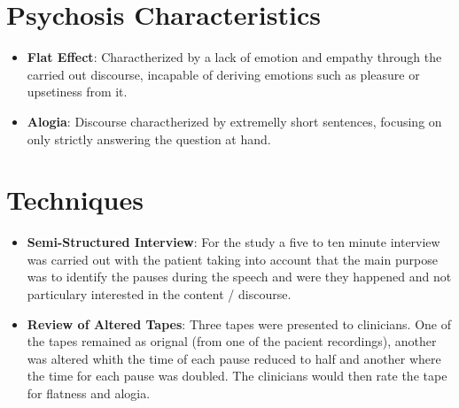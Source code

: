 \documentclass{Paper_Summary}
\begin{document}
\section{Psychosis Characteristics}
    \begin{itemize}
        \item \textbf{Flat Effect}: Charactherized by a lack of emotion and empathy through the carried out discourse, incapable of deriving emotions such as pleasure or upsetiness from it.
        \item \textbf{Alogia}: Discourse charactherized by extremelly short sentences, focusing on only strictly answering the question at hand.
    \end{itemize}

\section{Techniques}
    \begin{itemize}
        \item \textbf{Semi-Structured Interview}: For the study a five to ten minute interview was carried out with the patient taking into account that the main purpose was to identify the pauses during the speech and were they happened and not particulary interested in the content / discourse.
        \item \textbf{Review of Altered Tapes}: Three tapes were presented to clinicians. One of the tapes remained as orignal (from one of the pacient recordings), another was altered whith the time of each pause reduced to half and another where the time for each pause was doubled. The clinicians would then rate the tape for flatness and alogia.
    \end{itemize}
\end{document}
